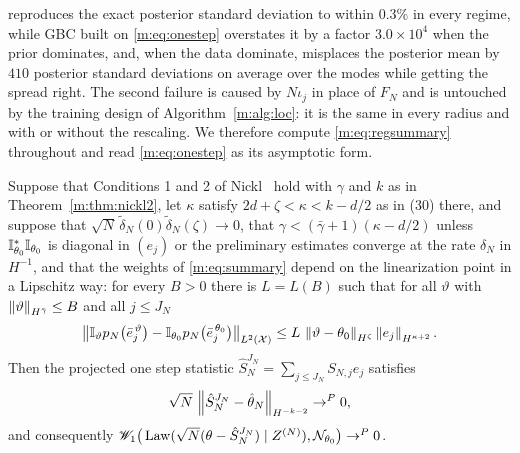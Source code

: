 \begin{remark}
reproduces the exact posterior standard deviation to within $0.3\%$ in every regime, while GBC built on \eqref{m:eq:onestep} overstates it by a factor $3.0\times10^4$ when the prior dominates, and, when the data dominate, misplaces the posterior mean by $410$ posterior standard deviations on average over the modes while getting the spread right. The second failure is caused by $N\iota_j$ in place of $F_N$ and is untouched by the training design of Algorithm~\ref{m:alg:loc}: it is the same in every radius and with or without the rescaling. We therefore compute \eqref{m:eq:regsummary} throughout and read \eqref{m:eq:onestep} as its asymptotic form.
\end{remark}

\begin{proposition}\label{m:prop:suff}
Suppose that Conditions 1 and 2 of Nickl~\cite{nicklbvm2024} hold with $\gamma$ and $k$ as in Theorem~\ref{m:thm:nickl2}, let $\kappa$ satisfy $2d+\zeta<\kappa<k-d/2$ as in (30) there, and suppose that $\sqrt N\,\tilde\delta_N(0)\tilde\delta_N(\zeta)\to0$, that $\gamma<(\bar\gamma+1)(\kappa-d/2)$ unless $\mathbb{I}^*_{\theta_0}\mathbb{I}_{\theta_0}$ is diagonal in $(e_j)$ or the preliminary estimates converge at the rate $\delta_N$ in $H^{-1}$, and that the weights of \eqref{m:eq:summary} depend on the linearization point in a Lipschitz way: for every $B>0$ there is $L=L(B)$ such that for all $\vartheta$ with $\left\|\vartheta\right\|_{H^{\bar\gamma}}\le B$ and all $j\le J_N$
\begin{equation}\label{m:eq:lipweight}
\big\|\mathbb{I}_\vartheta p_N\big(\bar e_j^{\,\vartheta}\big)-\mathbb{I}_{\theta_0}p_N\big(\bar e_j^{\,\theta_0}\big)\big\|_{L^2(\mathcal X)}\le L\,\left\|\vartheta-\theta_0\right\|_{H^\zeta}\left\|e_j\right\|_{H^{\kappa+2}} .
\end{equation}
Then the projected one step statistic $\hat S_N^{J_N}=\sum_{j\le J_N}S_{N,j}e_j$ satisfies
\[
\sqrt N\,\left\|\hat S^{J_N}_N-\hat\theta_N\right\|_{H^{-k-2}}\to^P0 ,
\]
and consequently $\mathscr{W}_1\big(\operatorname{Law}(\sqrt N(\theta-\hat S_N^{J_N})\mid Z^{(N)}),\mathcal{N}_{\theta_0}\big)\to^P0$.
\end{proposition}

